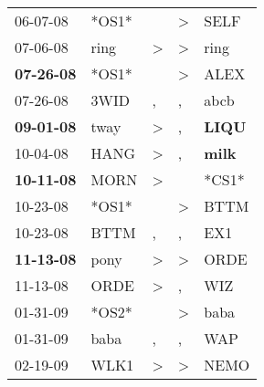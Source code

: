 \begin{supertabular}{p{0.07\textwidth}p{0.06\textwidth}p{0.02\textwidth}p{0.02\textwidth}p{0.06\textwidth}}
          06-07-08\textsuperscript{} &                            *OS1* &                  &     \textgreater &           SELF\textsuperscript{} \\
          07-06-08\textsuperscript{} &           ring\textsuperscript{} &     \textgreater &     \textgreater &           ring\textsuperscript{} \\
 \textbf{07-26-08\textsuperscript{}} &                            *OS1* &                  &     \textgreater &           ALEX\textsuperscript{} \\
          07-26-08\textsuperscript{} &           3WID\textsuperscript{} &                , &                , &           abcb\textsuperscript{} \\
 \textbf{09-01-08\textsuperscript{}} &           tway\textsuperscript{} &     \textgreater &                , &  \textbf{LIQU\textsuperscript{}} \\
          10-04-08\textsuperscript{} &           HANG\textsuperscript{} &     \textgreater &                , &  \textbf{milk\textsuperscript{}} \\
 \textbf{10-11-08\textsuperscript{}} &           MORN\textsuperscript{} &     \textgreater &                  &                            *CS1* \\
          10-23-08\textsuperscript{} &                            *OS1* &                  &     \textgreater &           BTTM\textsuperscript{} \\
          10-23-08\textsuperscript{} &           BTTM\textsuperscript{} &                , &                , &            EX1\textsuperscript{} \\
 \textbf{11-13-08\textsuperscript{}} &           pony\textsuperscript{} &     \textgreater &     \textgreater &           ORDE\textsuperscript{} \\
          11-13-08\textsuperscript{} &           ORDE\textsuperscript{} &     \textgreater &                , &            WIZ\textsuperscript{} \\
          01-31-09\textsuperscript{} &                            *OS2* &                  &     \textgreater &           baba\textsuperscript{} \\
          01-31-09\textsuperscript{} &           baba\textsuperscript{} &                , &                , &            WAP\textsuperscript{} \\
          02-19-09\textsuperscript{} &           WLK1\textsuperscript{} &     \textgreater &     \textgreater &           NEMO\textsuperscript{} \\

\end{supertabular}
